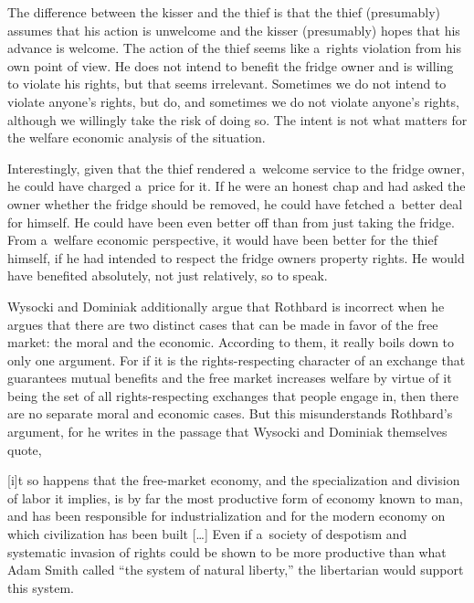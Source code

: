 The difference between the kisser and the thief is that the thief (presumably) assumes that his action is unwelcome and the kisser (presumably) hopes that his advance is welcome. The action of the thief seems like a~rights violation from his own point of view. He does not intend to benefit the fridge owner and is willing to violate his rights, but that seems irrelevant. Sometimes we do not intend to violate anyone's rights, but do, and sometimes we do not violate anyone's rights, although we willingly take the risk of doing so. The intent is not what matters for the welfare economic analysis of the situation.



Interestingly, given that the thief rendered a~welcome service to the fridge owner, he could have charged a~price for it. If he were an honest chap and had asked the owner whether the fridge should be removed, he could have fetched a~better deal for himself. He could have been even better off than from just taking the fridge. From a~welfare economic perspective, it would have been better for the thief himself, if he had intended to respect the fridge owners property rights. He would have benefited absolutely, not just relatively, so to speak.



Wysocki and Dominiak additionally argue that Rothbard is incorrect when he argues that there are two distinct cases that can be made in favor of the free market: the moral and the economic. According to them, it really boils down to only one argument. For if it is the rights-respecting character of an exchange that guarantees mutual benefits and the free market increases welfare by virtue of it being the set of all rights-respecting exchanges that people engage in, then there are no separate moral and economic cases. But this misunderstands Rothbard's argument, for he writes in the passage that Wysocki and Dominiak themselves quote,



[i]t so happens that the free-market economy, and the specialization and division of labor it implies, is by far the most productive form of economy known to man, and has been responsible for industrialization and for the modern economy on which civilization has been built […] Even if a~society of despotism and systematic invasion of rights could be shown to be more productive than what Adam Smith called ``the system of natural liberty,'' the libertarian would support this system. 
\parencite[][p.48]{rothbard_for_2006}%




